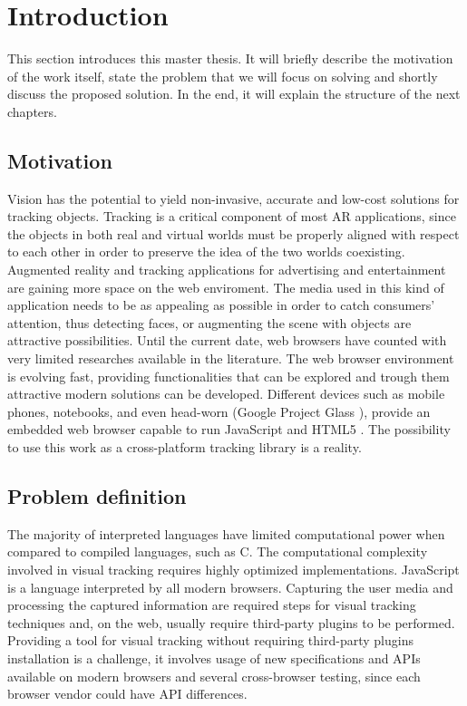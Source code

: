 \chapter{Introduction} %
\label{cha:introduction}

This section introduces this master thesis. It will briefly describe the motivation of the work itself, state the problem that we will focus on solving and shortly discuss the proposed solution. In the end, it will explain the structure of the next chapters.

\section{Motivation} %
\label{sec:introduction:motivation}

Vision has the potential to yield non-invasive, accurate and low-cost solutions for tracking objects. Tracking is a critical component of most AR applications, since the objects in both real and virtual worlds must be properly aligned with respect to each other in order to preserve the idea of the two worlds coexisting. Augmented reality and tracking applications for advertising and entertainment are gaining more space on the web enviroment. The media used in this kind of application needs to be as appealing as possible in order to catch consumers' attention, thus detecting faces, or augmenting the scene with objects are attractive possibilities. Until the current date, web browsers have counted with very limited researches available in the literature. The web browser environment is evolving fast, providing functionalities that can be explored and trough them attractive modern solutions can be developed. Different devices such as mobile phones, notebooks, and even head-worn \cite{Benford1998} (Google Project Glass \cite{Glass2013}), provide an embedded web browser capable to run JavaScript and HTML5 \cite{International2009,Hickson2013}. The possibility to use this work as a cross-platform tracking library is a reality.


\section{Problem definition} %
\label{sec:introduction:problem_definition}

The majority of interpreted languages have limited computational power when compared to compiled languages, such as C. The computational complexity involved in visual tracking requires highly optimized implementations. JavaScript \cite{International2009}  is a language interpreted by all modern browsers. Capturing the user media and processing the captured information are required steps for visual tracking techniques and, on the web, usually require third-party plugins to be performed. Providing a tool for visual tracking without requiring third-party plugins installation is a challenge, it involves usage of new specifications and APIs available on modern browsers and several cross-browser testing, since each browser vendor could have API differences.


